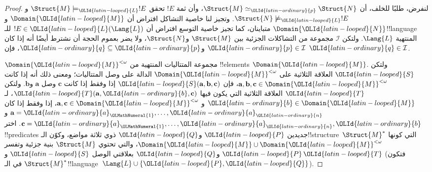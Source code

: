 \documentclass[../../../include/open-logic-section]{subfiles}
\begin{document}
\begin{proof}
لنفرض، طلبًا للخلف، أن $\Struct{M} \simeq_{\OLId{latin-ordinary}{p}} \Struct{N}$، وأن ثمة $!E$ تحقق
$\Struct{M} \models_{\OLId{latin-looped}{L}} !E$ و$\Struct{N} \not\models_{\OLId{latin-looped}{L}} !E$. وتجيز لنا خاصية
التشاكل افتراض أن $\Domain{{\OLId{latin-looped}{M}}}$ و$\Domain{{\OLId{latin-looped}{N}}}$ متباينان، كما تجيز خاصية
التوسع افتراض أن $!E \in {\OLId{latin-looped}{L}}(\Lang{L})$ للـ!!{language} المنتهية
$\Lang{L}$. ولتكن $\mathcal{I}$ مجموعة من التشاكلات الجزئية بين
$\Struct{M}$ و$\Struct{N}$، ولا يضر بعموم الحجة أن نشترط أيضًا أنه إذا
كان ${\OLId{latin-ordinary}{p}} \in \mathcal{I}$ و${\OLId{latin-ordinary}{q}} \subseteq {\OLId{latin-ordinary}{p}}$، فإن ${\OLId{latin-ordinary}{q}} \in \mathcal{I}$.

$\Domain{{\OLId{latin-looped}{M}}}^{<\omega}$ مجموعة المتتاليات المنتهية من !!{element}s
$\Domain{{\OLId{latin-looped}{M}}}$. ولتكن ${\OLId{latin-looped}{S}}$ العلاقة الثلاثية على $\Domain{{\OLId{latin-looped}{M}}}^{<\omega}$
الدالة على وصل المتتاليات؛ ومعنى ذلك أنه إذا كانت
$\mathbf{a},\mathbf{b},\mathbf{c} \in \Domain{{\OLId{latin-looped}{M}}}^{<\omega}$، فإن
${\OLId{latin-looped}{S}}(\mathbf{a},\mathbf{b},\mathbf{c})$ إذا وفقط إذا كانت $\mathbf{c}$
وصل $\mathbf{a}$ و$\mathbf{b}$. ولتكن ${\OLId{latin-looped}{T}}$ العلاقة الثلاثية التي يكون
فيها ${\OLId{latin-looped}{T}}(\mathbf{a},{\OLId{latin-ordinary}{b}},\mathbf{c})$، لـ${\OLId{latin-ordinary}{b}} \in \Domain{{\OLId{latin-looped}{M}}}$ و
$\mathbf{a},\mathbf{c} \in \Domain{{\OLId{latin-looped}{M}}}^{<\omega}$، إذا وفقط إذا كان
$\mathbf{a}={\OLId{latin-ordinary}{a}}_{\OLMathNumeral{1}},\dots,{\OLId{latin-ordinary}{a}}_{\OLId{latin-ordinary}{n}}$ و$\mathbf{c}={\OLId{latin-ordinary}{a}}_{\OLMathNumeral{1}},\dots,{\OLId{latin-ordinary}{a}}_{\OLId{latin-ordinary}{n}},{\OLId{latin-ordinary}{b}}$. اختر
!!{predicate}s جديدين ${\OLId{latin-looped}{P}}$ و${\OLId{latin-looped}{Q}}$ ذوي ثلاثة مواضع، وكوّن
الـ!!{structure}~$\Struct{M}^*$ التي كونها
$\Domain{{\OLId{latin-looped}{M}}} \cup \Domain{{\OLId{latin-looped}{M}}}^{<\omega}$، والتي تحتوي $\Struct{M}$
بنية جزئية وتفسر ${\OLId{latin-looped}{P}}$ و${\OLId{latin-looped}{Q}}$ بعلاقتي الوصل ${\OLId{latin-looped}{S}}$ و${\OLId{latin-looped}{T}}$ (فتكون
$\Struct{M}^*$ في الـ!!{language}~$\Lang{L} \cup \{{\OLId{latin-looped}{P}},{\OLId{latin-looped}{Q}}\}$).


\end{proof}
\end{document}
